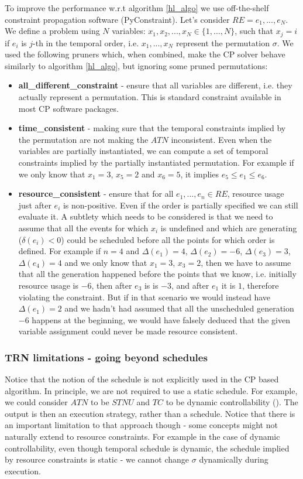 To improve the performance w.r.t algorithm \ref{hl_algo} we use off-the-shelf constraint propagation software (PyConstraint). Let's consider $RE={e_1, ..., e_N}$. We define a problem using $N$ variables:  $x_1, x_2, ..., x_N \in \{ 1, ..., N \}$, such that $x_j=i$ if $e_i$ is $j$-th in the temporal order, i.e. $x_1, ..., x_N$ represent the permutation $\sigma$. We used the following pruners which, when combined, make the CP solver behave similarly to algorithm \ref{hl_algo}, but ignoring some pruned permutations:
\begin{itemize}
\item \textbf{all\_different\_constraint} - ensure that all variables are different, i.e. they actually represent a permutation. This is standard constraint available in most CP software packages.
\item \textbf{time\_consistent} - making sure that the temporal constraints implied by the permutation are not making the $ATN$ inconsistent. Even when the variables are partially instantiated, we can compute a set of temporal constraints implied by the partially instantiated permutation. For example if we only know that $x_1 = 3$, $x_5 = 2$ and $x_6=5$, it implies $e_5 \leq e_1 \leq e_6$.
\item \textbf{resource\_consistent} - ensure that for all $e_1, ..., e_n \in RE$, resource usage just after $e_i$ is non-positive. Even if the order is partially specified we can still evaluate it. A subtlety which needs to be considered is that we need to assume that all the events for which $x_i$ is undefined and which are generating ($\delta(e_i) < 0$) could be scheduled before all the points for which order is defined. For example if $n = 4$ and $\Delta(e_1) = 4$, $\Delta(e_2) = -6$, $\Delta(e_3) = 3$, $\Delta(e_4) = 4$ and we only know that $x_1 = 3$, $x_3 = 2$, then we have to assume that all the generation happened before the points that we know, i.e. initially resource usage is $-6$, then after $e_3$ is is $-3$, and after $e_1$ it is $1$, therefore violating the constraint. But if in that scenario we would instead have $\Delta(e_1) = 2$ and we hadn't had assumed that all the unscheduled generation $-6$ happens at the beginning, we would have falsely deduced that the given variable assignment could never be made resource consistent.
\end{itemize}

\subsubsection{TRN limitations - going beyond schedules}
Notice that the notion of the schedule is not explicitly used in the CP based algorithm. In principle, we are not required to use a static schedule. For example, we could consider $ATN$ to be $STNU$ and $TC$ to be dynamic controllability (\cite{vidal1996dealing}). The output is then an execution strategy, rather than a schedule. Notice that there is an important limitation to that approach though - some concepts might not naturally extend to resource constraints. For example in the case of dynamic controllability, even though temporal schedule is dynamic, the schedule implied by resource constraints is static - we cannot change $\sigma$ dynamically during execution.

